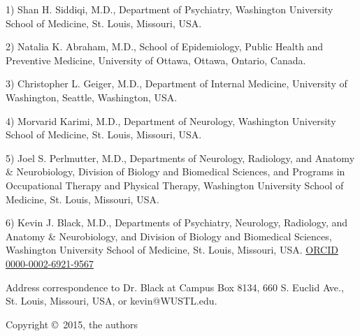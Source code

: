 1) Shan H. Siddiqi, M.D., Department of Psychiatry, Washington University School of Medicine, St. Louis, Missouri, USA.

2) Natalia K. Abraham, M.D., School of Epidemiology, Public Health and Preventive Medicine, University of Ottawa, Ottawa, Ontario, Canada.

3) Christopher L. Geiger, M.D., Department of Internal Medicine, University of Washington, Seattle, Washington, USA.

4) Morvarid Karimi, M.D., Department of Neurology, Washington University School of Medicine, St. Louis, Missouri, USA.

5) Joel S. Perlmutter, M.D., Departments of Neurology, Radiology, and Anatomy & Neurobiology, Division of Biology and Biomedical Sciences, and Programs in Occupational Therapy and Physical Therapy, Washington University School of Medicine, St. Louis, Missouri, USA.

6) Kevin J. Black, M.D., Departments of Psychiatry, Neurology, Radiology, and Anatomy \& Neurobiology, and Division of Biology and Biomedical Sciences, Washington University School of Medicine, St. Louis, Missouri, USA.  \href{http://orcid.org/0000-0002-6921-9567}{ORCID 0000-0002-6921-9567}

Address correspondence to Dr. Black at Campus Box 8134, 660 S. Euclid Ave., St. Louis, Missouri, USA, or kevin@WUSTL.edu.

Copyright \copyright\, 2015, the authors
  
